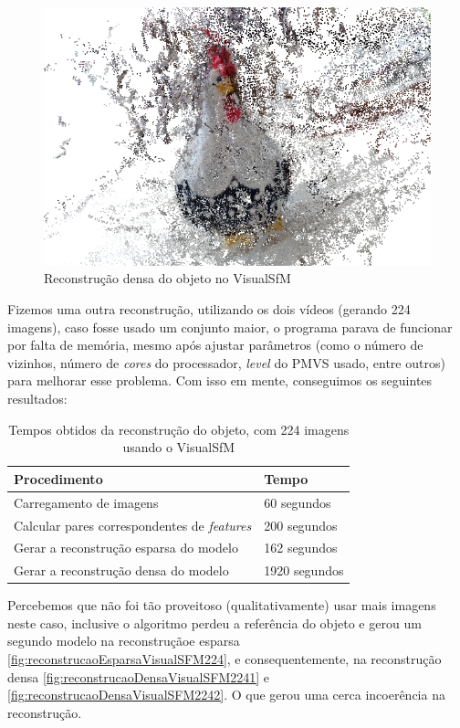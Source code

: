 \begin{figure}[!h]
	\centering
	\includegraphics[width=0.5\linewidth]{figs/galinhadense.jpg}
	\caption{%
	Reconstrução densa do objeto no VisualSfM
	}\label{fig:reconstrucaoDensaVisualSFM}
\end{figure}

Fizemos uma outra reconstrução, utilizando os dois vídeos (gerando 224 imagens), caso fosse usado um conjunto maior, o programa parava de funcionar por falta de memória, mesmo após ajustar parâmetros (como o número de vizinhos, número de \emph{cores} do processador, \emph{level} do PMVS usado, entre outros) para melhorar esse problema. Com isso em mente, conseguimos os seguintes resultados:

\begin{table}
\caption{Tempos obtidos da reconstrução do objeto, com 224 imagens usando o VisualSfM}
\label{tab:temposSfM224}
\begin{tabular}{|l|p{4.7cm}|}
\hline
Procedimento & Tempo \\ \hline
Carregamento de imagens & 60 segundos \\ \hline
Calcular pares correspondentes de \emph{features} & 200 segundos \\ \hline
Gerar a reconstrução esparsa do modelo & 162 segundos \\ \hline
Gerar a reconstrução densa do modelo & 1920 segundos \\ \hline
\end{tabular}
\end{table}

Percebemos que não foi tão proveitoso (qualitativamente) usar mais imagens neste caso, inclusive o algoritmo perdeu a referência do objeto e gerou um segundo modelo na reconstruçãoe esparsa \ref{fig:reconstrucaoEsparsaVisualSFM224}, e consequentemente, na reconstrução densa \ref{fig:reconstrucaoDensaVisualSFM2241} e \ref{fig:reconstrucaoDensaVisualSFM2242}. O que gerou uma cerca incoerência na reconstrução.

